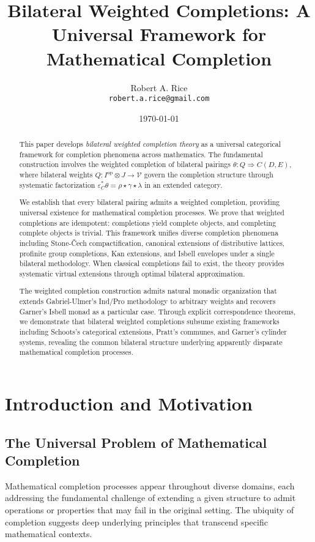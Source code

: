 \documentclass[11pt]{article}
\title{Bilateral Weighted Completions: A Universal Framework for Mathematical Completion}
\author{Robert A. Rice\\
\texttt{robert.a.rice@gmail.com}}
\date{\today}
\theoremstyle{plain}
\theoremstyle{definition}
\theoremstyle{remark}
\newcommand{\V}{\mathcal{V}}
\newcommand{\op}{\mathrm{op}}
\begin{document}
\maketitle

\begin{abstract}
This paper develops \emph{bilateral weighted completion theory} as a universal categorical framework for completion phenomena across mathematics. The fundamental construction involves the weighted completion of bilateral pairings $\theta : Q \Rightarrow C(D,E)$, where bilateral weights $Q : I^{\op} \otimes J \to \V$ govern the completion structure through systematic factorization $\varepsilon_C^* \theta = \rho \star \gamma \star \lambda$ in an extended category.

We establish that every bilateral pairing admits a weighted completion, providing universal existence for mathematical completion processes. We prove that weighted completions are idempotent: completions yield complete objects, and completing complete objects is trivial. This framework unifies diverse completion phenomena including Stone-\v{C}ech compactification, canonical extensions of distributive lattices, profinite group completions, Kan extensions, and Isbell envelopes under a single bilateral methodology. When classical completions fail to exist, the theory provides systematic virtual extensions through optimal bilateral approximation.

The weighted completion construction admits natural monadic organization that extends Gabriel-Ulmer's Ind/Pro methodology to arbitrary weights and recovers Garner's Isbell monad as a particular case. Through explicit correspondence theorems, we demonstrate that bilateral weighted completions subsume existing frameworks including Schoots's categorical extensions, Pratt's communes, and Garner's cylinder systems, revealing the common bilateral structure underlying apparently disparate mathematical completion processes.
\end{abstract}

\section{Introduction and Motivation}

\subsection{The Universal Problem of Mathematical Completion}

Mathematical completion processes appear throughout diverse domains, each addressing the fundamental challenge of extending a given structure to admit operations or properties that may fail in the original setting. The ubiquity of completion suggests deep underlying principles that transcend specific mathematical contexts.
\end{document}
